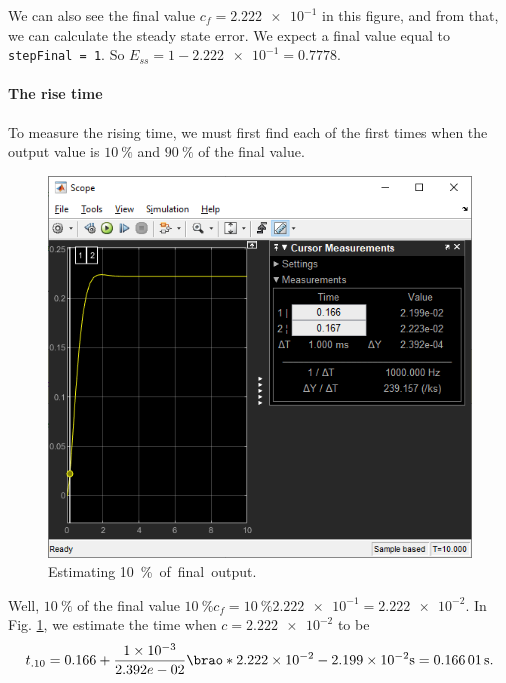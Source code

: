 \documentclass[12pt]{article}
\DeclarePairedDelimiter\brao()%
\begin{document}
We can also see the final value $c_f = \num{2.222e-1}$ in this figure,
and from that, we can calculate the steady state error.
We expect a final value equal to \texttt{stepFinal = 1}.
So $E_{ss} = 1 - \num{2.222e-1} = 0.7778$.

\paragraph{The rise time} To measure the rising time,
we must first find each of the first times when the output value is $\SI{10}\percent$ and $\SI{90}\percent$
of the final value.

\begin{figure}[h]
    \centering
    \includegraphics[width=\linewidth]{part01a_measuring_pc10.png}
    \caption{Estimating \SI{10}\percent of final output.}
    \label{fig:step - estimating 10 percent}
\end{figure}

Well, $\SI{10}\percent$ of the final value $\SI{10}\percent c_f = \SI{10}\percent \num{2.222e-1} = \num{2.222e-2}$.
In Fig. \ref{fig:step - estimating 10 percent}, we estimate the time when $c = \num{2.222e-2}$ to be
$$
	t_{.10} = 0.166 + \frac{\num{1e-3}}{\num 2.392e-02}\brao*{\num{2.222e-2} - \num{2.199e-2}} \si\second = \SI{0.16601}\second.
$$
\end{document}
